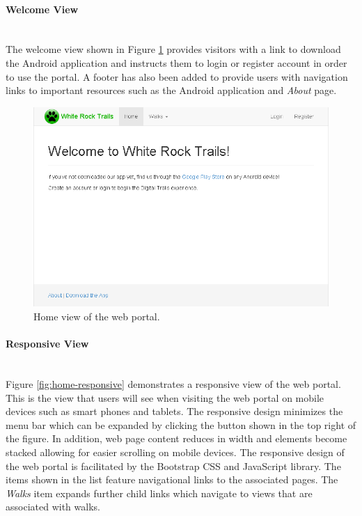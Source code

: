 \documentclass[11pt,a4paper]{report}
\begin{document}
\paragraph{Welcome View}\mbox{}\\
The welcome view shown in Figure \ref{fig:home} provides visitors with a link to download the Android application and instructs them to login or register account in order to use the portal. A footer has also been added to provide users with navigation links to important resources such as the Android application and \emph{About} page\cite{milestone2}.



\begin{figure}[H]

\centering

\includegraphics[width=1\linewidth]{./img/webportal/home}

\caption{Home view of the web portal.}

\label{fig:home}

\end{figure}



\paragraph{Responsive View}\mbox{}\\
Figure \ref{fig:home-responsive} demonstrates a responsive view of the web portal. This is the view that users will see when visiting the web portal on mobile devices such as smart phones and tablets. The responsive design minimizes the menu bar which can be expanded by clicking the button shown in the top right of the figure. In addition, web page content reduces in width and elements become stacked allowing for easier scrolling on mobile devices. The responsive design of the web portal is facilitated by the Bootstrap CSS and JavaScript library\cite{milestone2}. The items shown in the list feature navigational links to the associated pages. The \emph{Walks} item expands further child links which navigate to views that are associated with walks.
\end{document}

